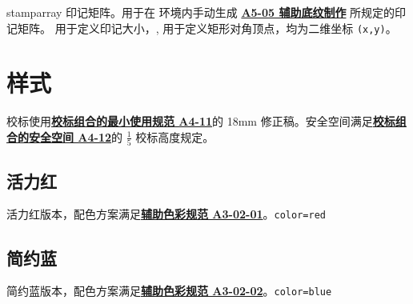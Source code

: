 \documentclass[a4paper,12pt]{article}
\begin{document}
\begin{CJK}{UTF8}{song}
\begin{docCommand*}[]{stamparray}{}
    印记矩阵。用于在  环境内手动生成 \href{http://vi.sjtu.edu.cn/index.php/articles/base/5}{\textbf{A5-05 辅助底纹制作}} 所规定的印记矩阵。 用于定义印记大小，, 用于定义矩形对角顶点，均为二维坐标 \verb"(x,y)"。 
\end{docCommand*}

\newpage
\section{样式}

校标使用\href{http://vi.sjtu.edu.cn/index.php/articles/base/4}{\textbf{校标组合的最小使用规范 A4-11}}的 18mm
 修正稿。安全空间满足\href{http://vi.sjtu.edu.cn/index.php/articles/base/4}{\textbf{校标组合的安全空间 A4-12}}的 $\frac{1}{5}$ 校标高度规定。

\subsection{活力红}

活力红版本，配色方案满足\href{http://vi.sjtu.edu.cn/index.php/articles/base/3}{\textbf{辅助色彩规范 A3-02-01}}。\hfill\texttt{color=red}

\begin{tcbraster}[raster columns=2,colframe=red,colback=white,
    colbacktitle=red!50!white,fonttitle=\small\bfseries\ttfamily,
    left=0pt,right=0pt,top=0pt,bottom=0pt,boxsep=0pt,boxrule=0.6pt,
    toptitle=1mm,bottomtitle=1mm,drop lifted shadow,center title,
    graphics pages={1,3,4,5,6,7}]
\end{tcbraster}

\subsection{简约蓝}

简约蓝版本，配色方案满足\href{http://vi.sjtu.edu.cn/index.php/articles/base/3}{\textbf{辅助色彩规范 A3-02-02}}。\hfill \texttt{color=blue}

\begin{tcbraster}[raster columns=2,colframe=blue,colback=white,
    colbacktitle=blue!50!white,fonttitle=\small\bfseries\ttfamily,
    left=0pt,right=0pt,top=0pt,bottom=0pt,boxsep=0pt,boxrule=0.6pt,
    toptitle=1mm,bottomtitle=1mm,drop lifted shadow,center title,
    graphics pages={1,3,4,5,6,7}]
\end{tcbraster}


\end{CJK}
\end{document}
